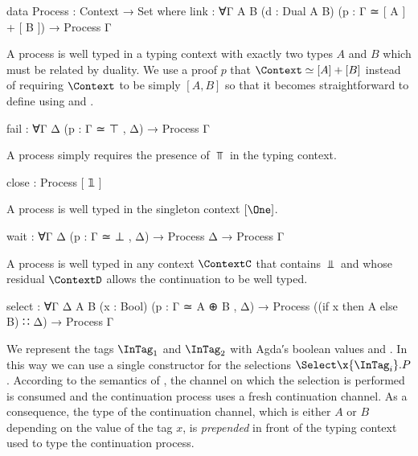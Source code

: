 \begin{AgdaAlign}
\begin{code}
data Process : Context → Set where
   link      : ∀{Γ A B} (d : Dual A B) (p : Γ ≃ [ A ] + [ B ]) → Process Γ
\end{code}

A  process is well typed in a typing context with
exactly two types $A$ and $B$ which must be related by duality. We use a proof
$p$ that $\Context \simeq [A] + [B]$ instead of requiring $\Context$ to be
simply $[A,B]$ so that it becomes straightforward to define \SLink using
 and .

\begin{code}
   fail      : ∀{Γ Δ} (p : Γ ≃ ⊤ , Δ) → Process Γ
\end{code}

A  process simply requires the presence of $\Top$
in the typing context.

\begin{code}
   close     : Process [ 𝟙 ]
\end{code}

A  process is well typed in the singleton
context $[\One]$.

\begin{code}
   wait      : ∀{Γ Δ} (p : Γ ≃ ⊥ , Δ) → Process Δ → Process Γ
\end{code}

A  process is well typed in any context
$\ContextC$ that contains $\Bot$ and whose residual $\ContextD$ allows the
continuation to be well typed.

\begin{code}
   select    : ∀{Γ Δ A B} (x : Bool) (p : Γ ≃ A ⊕ B , Δ) →
               Process ((if x then A else B) ∷ Δ) → Process Γ
\end{code}

We represent the tags $\InTag_1$ and $\InTag_2$ with Agda′s boolean values
 and . In this
way we can use a single constructor  for the
selections $\Select\x{\InTag_i}.P$. According to the semantics of \Calculus, the
channel on which the selection is performed is consumed and the continuation
process uses a fresh continuation channel. As a consequence, the type of the
continuation channel, which is either $A$ or $B$ depending on the value of the
tag $x$, is \emph{prepended} in front of the typing context used to type the
continuation process.


\end{AgdaAlign}
